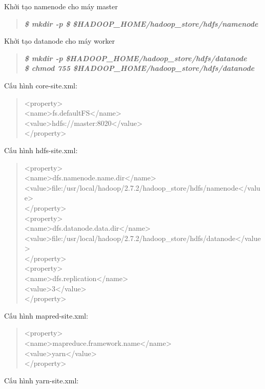 Khởi tạo namenode cho máy master
\begin{quote}
	\textbf{\textit{\$ mkdir -p
	\$ \$HADOOP\_HOME/hadoop\_store/hdfs/namenode}}
\end{quote}
Khởi tạo datanode cho máy worker
\begin{quote}
	\textbf{\textit{\$ mkdir -p \$HADOOP\_HOME/hadoop\_store/hdfs/datanode\\
	\$ chmod 755 \$HADOOP\_HOME/hadoop\_store/hdfs/datanode}}
\end{quote}
Cấu hình core-site.xml:
\begin{quote}
	<property>\\
		<name>fs.defaultFS</name>\\
		<value>hdfs://master:8020</value>\\
	</property>
\end{quote}
Cấu hình hdfs-site.xml:
\begin{quote}
	<property>\\
	<name>dfs.namenode.name.dir</name>\\
	<value>file:/usr/local/hadoop/2.7.2/hadoop\_store/hdfs/namenode</value>\\
	</property>\\
	<property>\\
	<name>dfs.datanode.data.dir</name>\\
	<value>file:/usr/local/hadoop/2.7.2/hadoop\_store/hdfs/datanode</value>\\
	</property>\\
	<property>\\
	<name>dfs.replication</name>\\
	<value>3</value>\\
	</property>\\
\end{quote}
Cấu hình mapred-site.xml:
\begin{quote}
	<property>\\
	<name>mapreduce.framework.name</name>\\
	<value>yarn</value>\\
	</property>
\end{quote}
Cấu hình yarn-site.xml:
